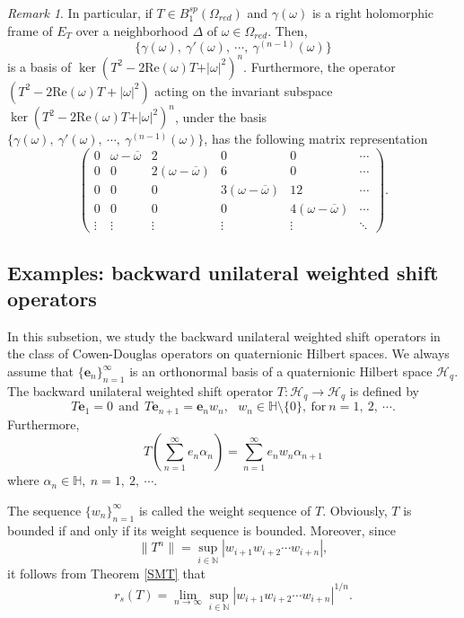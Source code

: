 \documentclass[pdflatex,sn-mathphys-num]{sn-jnl}%
\theoremstyle{thmstyleone}%
\theoremstyle{thmstyletwo}%
\newtheorem{remark}{Remark}%
\theoremstyle{thmstylethree}%
\theoremstyle{definition}
\theoremstyle{remark}
\newtheorem{remark}[theorem]{Remark}
\begin{document}
    \begin{remark}
	In particular, if $T\in B_1^{sp}(\Omega_{red})$ and $\gamma(\omega)$ is a right holomorphic  frame of $E_T$ over a neighborhood $\Delta$ of $\omega\in\Omega_{red}$. Then,
	\[
	\{\gamma(\omega),\ \gamma'(\omega),\ \cdots,\ \gamma^{(n-1)}(\omega)\}
	\]
	is a basis of $\ker(T^2-2\mathrm{Re}(\omega)T+\vert\omega\vert^2)^{n}$.
	Furthermore, the operator  $(T^2-2\mathrm{Re}(\omega)T+|\omega|^2)$ acting on the invariant subspace $\ker(T^2-2\mathrm{Re}(\omega)T+\vert\omega\vert^2)^{n}$, under the basis $\{\gamma(\omega),\ \gamma'(\omega),\ \cdots,\ \gamma^{(n-1)}(\omega)\}$,
	 has the following matrix representation
	\[
	\begin{pmatrix}
		0 &	\omega-\overline{\omega} & 2 & 0 & 0 & \cdots \\
		0 &  0                    &2(\omega-\overline{\omega}) & 6  & 0 & \cdots \\
		0 & 0  &0 & 3(\omega-\overline{\omega}) & 12 & \cdots \\
		0 & 0  &0 &  0 & 4(\omega-\overline{\omega})  & \cdots \\
		\vdots & \vdots & \vdots & \vdots & \vdots & \ddots
	\end{pmatrix}.
\]
\end{remark}


\subsection{Examples: backward unilateral weighted shift operators}

In this subsetion, we study the  backward unilateral weighted shift operators in the class of Cowen-Douglas operators on quaternionic Hilbert spaces. We always assume that $\{\mathbf{e}_n\}_{n=1}^{\infty}$ is an orthonormal basis  of a quaternionic Hilbert space $\mathcal{H}_q$. The backward unilateral weighted shift operator $T:\mathcal{H}_q\rightarrow\mathcal{H}_q$ is defined by
	\[
T\mathbf{e}_{1}=0\ \ \text{and} \ \ 	T\mathbf{e}_{n+1}=\mathbf{e}_{n}w_n,\ \ \ w_n\in\mathbb{H}\setminus\{0\},\ \text{for} \ n=1,\ 2,\ \cdots.
	\]
Furthermore,
$$T(\sum_{n=1}^{\infty}e_n\alpha_n) = \sum_{n=1}^{\infty}e_nw_n\alpha_{n+1}$$
where $\alpha_n\in\mathbb{H},\ n=1,\ 2,\ \cdots $.

The sequence $\{w_n\}_{n=1}^{\infty}$ is called the weight sequence of $T$. Obviously, $T$ is bounded if and only if its weight sequence is bounded. Moreover, since
\[
\|T^n\|=\sup\limits_{i\in\mathbb{N}} |w_{i+1}w_{i+2}\cdots w_{i+n}|,
\]
it follows from Theorem \ref{SMT} that
\[
r_s(T)=\lim\limits_{n\to\infty}\sup\limits_{i\in\mathbb{N}} |w_{i+1} w_{i+2}\cdots w_{i+n}|^{1/n}.
\]
\end{document}
